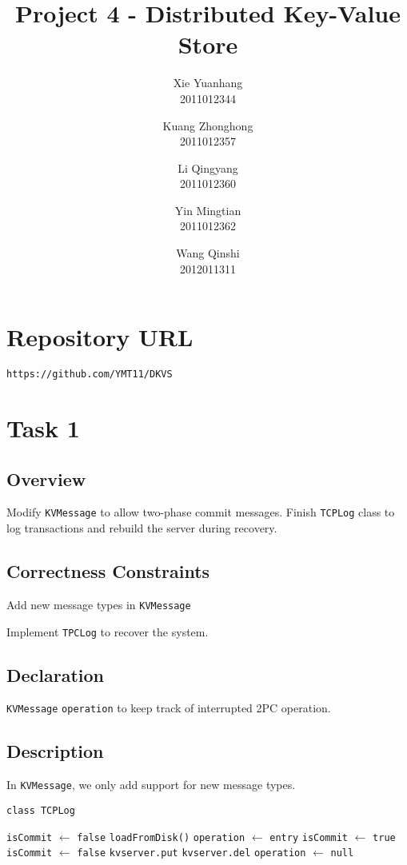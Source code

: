 \documentclass{article}
\title{Project 4 - Distributed Key-Value Store}
\author{
Xie Yuanhang  \\   2011012344\and
Kuang Zhonghong  \\   2011012357\and
Li Qingyang   \\   2011012360 \and
Yin Mingtian   \\   2011012362\and
Wang Qinshi   \\   2012011311}
\date{}
\begin{document}
\maketitle

\setcounter{section}{-1}
 \section{Repository URL}
\texttt{https://github.com/YMT11/DKVS}

\section{Task 1}
\subsection{Overview}
Modify \texttt{KVMessage} to allow two-phase commit messages. Finish \texttt{TCPLog} class to log transactions 
and rebuild the server during recovery.
\subsection{Correctness Constraints}
\begin{compactitem}
	\item Add new message types in \texttt{KVMessage}
	\item Implement \texttt{TPCLog} to recover the system.
\end{compactitem}
\subsection{Declaration}
\texttt{KVMessage} \texttt{operation} to keep track of interrupted 2PC operation.
\subsection{Description}
In \texttt{KVMessage}, we only add support for new message types.
\begin{algorithm}
	\caption{\texttt{class TCPLog}}
	\begin{algorithmic}
			\State \texttt{isCommit} $\leftarrow$ \texttt{false}
			\State \texttt{loadFromDisk()}
					\State \texttt{operation} $\leftarrow$ \texttt{entry}
					\State \texttt{isCommit} $\leftarrow$ \texttt{true}
					\State \texttt{isCommit} $\leftarrow$ \texttt{false}
						\State \texttt{kvserver.put}
						\State \texttt{kvserver.del}
					\EndIf
					\State \texttt{operation} $\leftarrow$ \texttt{null}
				\EndIf
			\EndFor
		\EndProcedure
	\end{algorithmic}
\end{algorithm}
\end{document}
